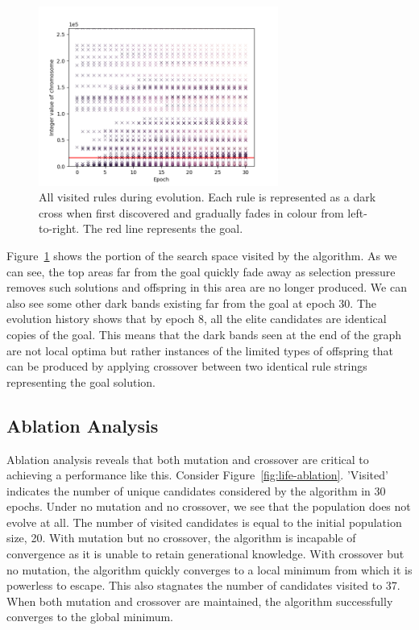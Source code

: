 \begin{figure}[!h]
\centering
\includegraphics[width=0.7\textwidth]{images/life_like_eval/life-searchgraph.png}
\caption{All visited rules during evolution. Each rule is represented as a dark cross when first discovered and gradually fades in colour from left-to-right. The red line represents the goal.}
\label{fig:life-searchgraph}
\end{figure}

Figure~\ref{fig:life-searchgraph} shows the portion of the search space visited by the algorithm. As we can see, the top areas far from the goal quickly fade away as selection pressure removes such solutions and offspring in this area are no longer produced. We can also see some other dark bands existing far from the goal at epoch 30. The evolution history shows that by epoch 8, all the elite candidates are identical copies of the goal. This means that the dark bands seen at the end of the graph are not local optima but rather instances of the limited types of offspring that can be produced by applying crossover between two identical rule strings representing the goal solution.\\

\subsection{Ablation Analysis}
Ablation analysis reveals that both mutation and crossover are critical to achieving a performance like this. Consider Figure~\ref{fig:life-ablation}. 'Visited' indicates the number of unique candidates considered by the algorithm in 30 epochs. Under no mutation and no crossover, we see that the population does not evolve at all. The number of visited candidates is equal to the initial population size, 20. With mutation but no crossover, the algorithm is incapable of convergence as it is unable to retain generational knowledge. With crossover but no mutation, the algorithm quickly converges to a local minimum from which it is powerless to escape. This also stagnates the number of candidates visited to 37. When both mutation and crossover are maintained, the algorithm successfully converges to the global minimum.\\ 

